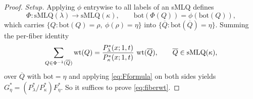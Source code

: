 \begin{proof}
\emph{Setup.} Applying $\phi$ entrywise to all labels of an sMLQ defines
\[
\Phi:\mathrm{sMLQ}(\lambda)\to\mathrm{sMLQ}(\kappa),\qquad
\mathrm{bot}(\Phi(Q))=\phi(\mathrm{bot}(Q)),
\]
which carries $\{Q:\mathrm{bot}(Q)=\rho,\ \phi(\rho)=\eta\}$ into
$\{\overline Q:\mathrm{bot}(\overline Q)=\eta\}$. Summing the per-fiber identity
\begin{equation}\label{eq:fiberwt}
\sum_{Q\in\Phi^{-1}(\overline Q)}\operatorname{wt}(Q)
=\frac{P^*_\lambda(x;1,t)}{P^*_\kappa(x;1,t)}\,\operatorname{wt}(\overline Q),
\qquad \overline Q\in\mathrm{sMLQ}(\kappa),
\end{equation}
over $\overline Q$ with $\mathrm{bot}=\eta$ and applying \eqref{eq:Fformula} on both
sides yields $G^*_\eta=(P^*_\lambda/P^*_\kappa)F^*_\eta$. So it suffices to prove
\eqref{eq:fiberwt}.


\end{proof}
